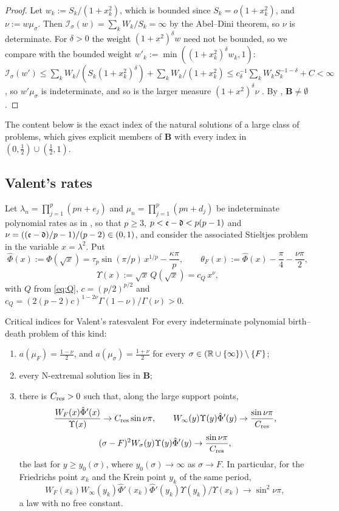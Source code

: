 \begin{proof}
 Let $w_k:=S_k/(1+x_k^2)$, which is bounded since $S_k=o(1+x_k^2)$, and
$\nu:=w\mu_\sigma$. Then $\mathcal I_\sigma(w)=\sum_kW_k/S_k=\infty$ by the Abel--Dini theorem, so $\nu$ is
determinate. For $\delta>0$ the weight $(1+x^2)^\delta w$ need not be bounded, so we compare with the
bounded weight $w'_k:=\min((1+x_k^2)^\delta w_k,1)$:
$\mathcal I_\sigma(w')\le\sum_kW_k/(S_k(1+x_k^2)^\delta)+\sum_kW_k/(1+x_k^2)\le c_\delta^{-1}\sum_kW_kS_k^{-1-\delta}+C<\infty$,
so $w'\mu_\sigma$ is indeterminate, and so is the larger measure $(1+x^2)^\delta\nu$
\cite[Lemma~1.1(i)]{BergSzwarc2026}. By \cite[Prop.~1.7(ii)]{BergSzwarc2026}, $\mathbf B\ne\emptyset$.
\end{proof}

The content below is the exact index of the natural solutions of a large class of problems, which
gives explicit members of $\mathbf B$ with every index in $(0,\frac12)\cup(\frac12,1)$.

\subsection{Valent's rates}

Let $\lambda_n=\prod_{j=1}^p(pn+e_j)$ and $\mu_n=\prod_{j=1}^p(pn+d_j)$ be indeterminate polynomial rates
as in , so that $p\ge3$, $p<\mathfrak e-\mathfrak d<p(p-1)$ and $\nu=((\mathfrak e-\mathfrak d)/p-1)/(p-2)\in(0,1)$, and
consider the associated Stieltjes problem in the variable $x=\lambda^2$. Put
\[
  \hat\Phi(x):=\Phi(\sqrt x)=\tau_p\sin(\pi/p)\,x^{1/p}-\frac{\kappa\pi}p,\qquad
  \theta_F(x):=\hat\Phi(x)-\frac\pi4-\frac{\nu\pi}2,
\]
\[
  \Upsilon(x):=\sqrt x\,Q(\sqrt x)=c_Q\,x^\nu ,
\]
with $Q$ from \eqref{eq:Q}, $c=(p/2)^{p/2}$ and $c_Q=(2(p-2)c)^{1-2\nu}\Gamma(1-\nu)/\Gamma(\nu)>0$.

\begin{theorem}{Critical indices for Valent's rates}{valent}
For every indeterminate polynomial birth--death problem of this kind:
\begin{enumerate}
\item[(a)] $a(\mu_F)=\frac{1-\nu}2$, and $a(\mu_\sigma)=\frac{1+\nu}2$ for every $\sigma\in(\mathbb{R}\cup\{\infty\})\setminus\{F\}$;
\item[(b)] every N-extremal solution lies in $\mathbf B$;
\item[(c)] there is $C_{\mathrm{res}}>0$ such that, along the large support points,
  \[
    \frac{W_F(x)\hat\Phi'(x)}{\Upsilon(x)}\to C_{\mathrm{res}}\sin\nu\pi,\qquad
    W_\infty(y)\Upsilon(y)\hat\Phi'(y)\to\frac{\sin\nu\pi}{C_{\mathrm{res}}},
  \]
  \[
    (\sigma-F)^2W_\sigma(y)\Upsilon(y)\hat\Phi'(y)\to\frac{\sin\nu\pi}{C_{\mathrm{res}}},
  \]
  the last for $y\ge y_0(\sigma)$, where $y_0(\sigma)\to\infty$ as $\sigma\to F$. In particular, for the
  Friedrichs point $x_k$ and the Krein point $y_k$ of the same period,
  \[
    W_F(x_k)W_\infty(y_k)\hat\Phi'(x_k)\hat\Phi'(y_k)\Upsilon(y_k)/\Upsilon(x_k)\to\sin^2\nu\pi,
  \]
  a law with no free constant.
\end{enumerate}
\end{theorem}

